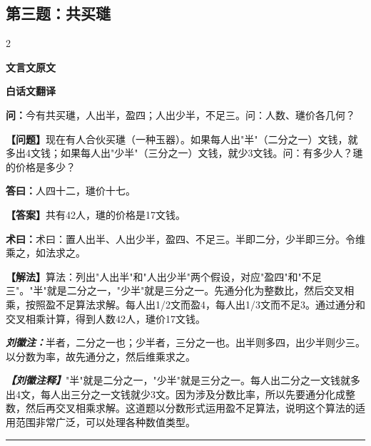 \documentclass[10pt,a4paper]{article}
\newcommand{\wen}[1]{\textbf{\color{problemcolor}问：}#1\par}
\newcommand{\da}[1]{\textbf{答曰：}#1\par}
\newcommand{\shu}[1]{\textbf{术曰：}#1\par}
\newcommand{\liuhui}[1]{{\color{commentarycolor}\textit{\textbf{刘徽注：}}#1\par}}
\newcommand{\classicalheader}[1]{{\centering\large\bfseries\color{classicalcolor} #1\par\vspace{0.5em}}}
\newcommand{\wenmodern}[1]{\textbf{\color{moderncolor}【问题】}#1\par}
\newcommand{\damodern}[1]{\textbf{【答案】}#1\par}
\newcommand{\shumodern}[1]{\textbf{【解法】}#1\par}
\newcommand{\liuhuimodern}[1]{{\color{commentarycolor}\textit{\textbf{【刘徽注释】}}#1\par}}
\newcommand{\modernheader}[1]{{\centering\large\bfseries\color{moderncolor} #1\par\vspace{0.5em}}}
\newcommand{\problemsec}[1]{\subsection*{#1}}
\begin{document}
\problemsec{第三题：共买璡}
\begin{paracol}{2}
\classicalheader{文言文原文}
\switchcolumn
\modernheader{白话文翻译}
\switchcolumn*

\wen{今有共买璡，人出半，盈四；人出少半，不足三。问：人数、璡价各几何？}

\switchcolumn

\wenmodern{现在有人合伙买璡（一种玉器）。如果每人出"半"（二分之一）文钱，就多出4文钱；如果每人出"少半"（三分之一）文钱，就少3文钱。问：有多少人？璡的价格是多少？}

\switchcolumn*

\da{人四十二，璡价十七。}

\switchcolumn

\damodern{共有42人，璡的价格是17文钱。}

\switchcolumn*

\shu{术曰：置人出半、人出少半，盈四、不足三。半即二分，少半即三分。令维乘之，如法求之。}

\switchcolumn

\shumodern{算法：列出"人出半"和"人出少半"两个假设，对应"盈四"和"不足三"。"半"就是二分之一，"少半"就是三分之一。先通分化为整数比，然后交叉相乘，按照盈不足算法求解。每人出1/2文而盈4，每人出1/3文而不足3。通过通分和交叉相乘计算，得到人数42人，璡价17文钱。}

\switchcolumn*

\liuhui{半者，二分之一也；少半者，三分之一也。出半则多四，出少半则少三。以分数为率，故先通分之，然后维乘求之。}

\switchcolumn

\liuhuimodern{"半"就是二分之一，"少半"就是三分之一。每人出二分之一文钱就多出4文，每人出三分之一文钱就少3文。因为涉及分数比率，所以先要通分化成整数，然后再交叉相乘求解。这道题以分数形式运用盈不足算法，说明这个算法的适用范围非常广泛，可以处理各种数值类型。}

\end{paracol}

\vspace{0.3cm}
\hrule
\vspace{0.3cm}
\end{document}
